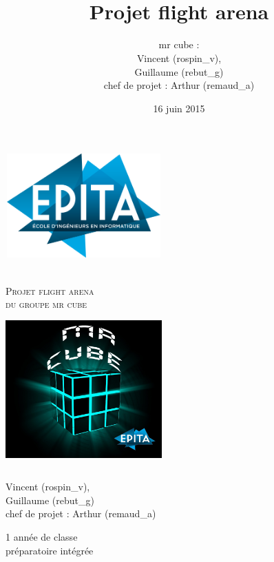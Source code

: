 \documentclass[12pt, titlepage]{article}
\title{\bsc{Rapport de projet}\\Projet flight arena}
\author{mr cube :\\
Vincent \bsc{Rospini Clerici} (rospin\_v),\\
Guillaume \bsc{Rebut} (rebut\_g)\\
chef de projet : Arthur \bsc{Remaud} (remaud\_a)}
\date{16 juin 2015}
\begin{document}
\begin{spacing}{1.5}


\begin{titlepage}

\begin{flushright}
\includegraphics[height=4cm, width=6cm]{logo-epita.png}\\[2cm]
\end{flushright}

\begin{center}
\textsc{\LARGE {}}\\[1.5cm]

\textsc{\Large Projet flight arena}\\
\textsc{du groupe mr cube}\\[1.5cm]

\includegraphics[height=6cm, width=6cm]{MRCUBE.png}\\[1cm]

\begin{flushleft}
Vincent  (rospin\_v),\\
Guillaume  (rebut\_g)\\
chef de projet : Arthur  (remaud\_a)
\end{flushleft}

\begin{flushright}
1\ier{} année de classe\\ préparatoire intégrée
\end{flushright}


\end{center}
\end{titlepage}
\end{spacing}
\end{document}
